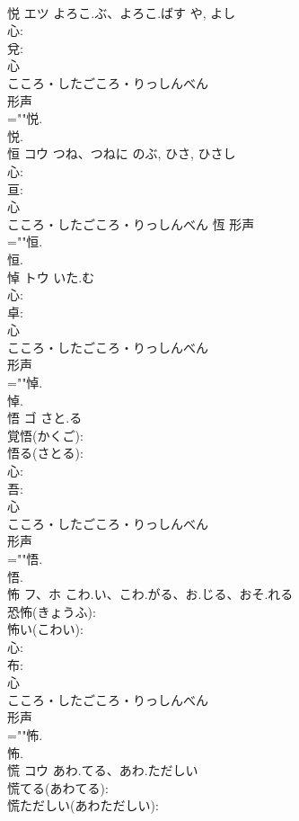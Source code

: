 \documentclass[8pt]{extreport}
\begin{document}
\begin{CJK}{UTF8}{min}
\\	悦	エツ	よろこ.ぶ、よろこ.ばす	や, よし	
\\	心: 
\\	兌: 
\\	心	
\\	こころ・したごころ・りっしんべん	
\\	形声 
\\	=""悦.
\\	悦.
\\	恒	コウ	つね、つねに	のぶ, ひさ, ひさし	
\\	心: 
\\	亘: 
\\	心	
\\	こころ・したごころ・りっしんべん	恆	形声 
\\	=""恒.
\\	恒.
\\	悼	トウ	いた.む		
\\	心: 
\\	卓: 
\\	心	
\\	こころ・したごころ・りっしんべん	
\\	形声 
\\	=""悼.
\\	悼.
\\	悟	ゴ	さと.る		
\\	覚悟(かくご): 
\\	悟る(さとる): 
\\	心: 
\\	吾: 
\\	心	
\\	こころ・したごころ・りっしんべん	
\\	形声 
\\	=""悟.
\\	悟.
\\	怖	フ、ホ	こわ.い、こわ.がる、お.じる、おそ.れる		
\\	恐怖(きょうふ): 
\\	怖い(こわい): 
\\	心: 
\\	布: 
\\	心	
\\	こころ・したごころ・りっしんべん	
\\	形声 
\\	=""怖.
\\	怖.
\\	慌	コウ	あわ.てる、あわ.ただしい		
\\	慌てる(あわてる): 
\\	慌ただしい(あわただしい): 

\end{CJK}
\end{document}
